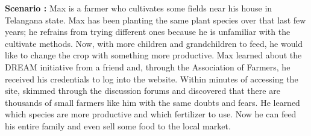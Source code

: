 \begin{flushleft}
\textbf{Scenario :} 
Max is a farmer who cultivates some fields near his house in Telangana state. Max has been planting the same plant species over that last few years; he refrains from trying different ones because he is unfamiliar with the cultivate methods. Now, with more children and grandchildren to feed, he would like to change the crop with something more productive. 
Max learned about the DREAM initiative from a friend and, through the Association of Farmers, he received his credentials to log into the website.
Within minutes of accessing the site, skimmed through the discussion forums and discovered that there are thousands of small farmers like him with the same doubts and fears.
He learned which species are more productive and which fertilizer to use.
Now he can feed his entire family and even sell some food to the local market.
\end{flushleft}